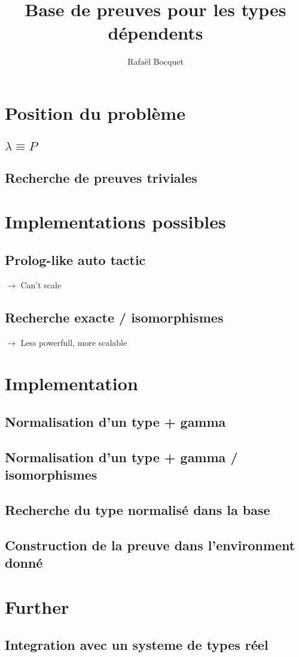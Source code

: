\documentclass[12pt, a4paper]{article}
\title{Base de preuves pour les types dépendents}
\author{Rafaël Bocquet}
\date{}
\begin{document}
\maketitle
\tableofcontents

\newpage

\section{Position du problème}
\subsection{$\lambda \equiv P$}
\subsection{Recherche de preuves triviales}
\section{Implementations possibles}
\subsection{Prolog-like auto tactic} $\rightarrow$ Can't scale
\subsection{Recherche exacte / isomorphismes} $\rightarrow$ Less powerfull, more scalable
\section{Implementation}
\subsection{Normalisation d'un type + gamma}
\subsection{Normalisation d'un type + gamma / isomorphismes}
\subsection{Recherche du type normalisé dans la base}
\subsection{Construction de la preuve dans l'environment donné}
\section{Further}
\subsection{Integration avec un systeme de types réel}

% 
\end{document}

